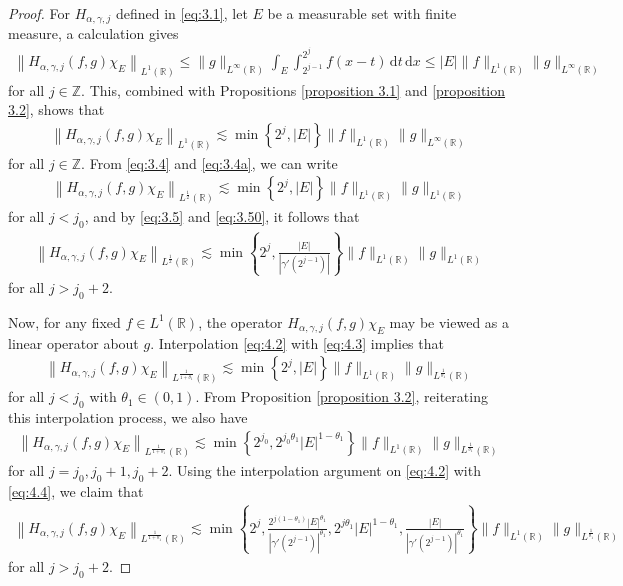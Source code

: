 \documentclass[10pt,a4paper]{amsart}
\begin{document}
\begin{proof}
For $H_{\alpha,\gamma,j}$ defined in \eqref{eq:3.1}, let $E$ be a measurable set with finite measure, a calculation gives
\begin{align*}
 \left \|H_{\alpha,\gamma,j}(f,g)\chi_{E}\right\|_{L^{1}(\mathbb{R})}
  \leq\|g\|_{L^{\infty}(\mathbb{R})}\int_{E}\int_{2^{j-1}}^{2^j}f(x-t)\,\textrm{d}t\,\textrm{d}x
  \leq|E|\|f\|_{L^{1}(\mathbb{R})}\|g\|_{L^{\infty}(\mathbb{R})}
 \end{align*}
for all $j\in \mathbb{Z}$. This, combined with Propositions \ref{proposition 3.1} and \ref{proposition 3.2}, shows that
  \begin{align}\label{eq:4.2}
  \left\|H_{\alpha,\gamma,j}(f,g)\chi_{E}\right\|_{L^{1}(\mathbb{R})}\lesssim \min\left\{2^j,|E|\right\}\|f\|_{L^{1}(\mathbb{R})}\|g\|_{L^{\infty}(\mathbb{R})}
  \end{align}
for all $j\in \mathbb{Z}$. From \eqref{eq:3.4} and \eqref{eq:3.4a}, we can write
  \begin{align}\label{eq:4.3}
  \left\|H_{\alpha,\gamma,j}(f,g)\chi_{E}\right\|_{L^{\frac{1}{2}}(\mathbb{R})}\lesssim \min\left\{2^j,|E|\right\}\|f\|_{L^{1}(\mathbb{R})}\|g\|_{L^{1}(\mathbb{R})}
  \end{align}
  for all $j<j_0$, and by \eqref{eq:3.5} and \eqref{eq:3.50}, it follows that
   \begin{align}\label{eq:4.4}
  \left\|H_{\alpha,\gamma,j}(f,g)\chi_{E}\right\|_{L^{\frac{1}{2}}(\mathbb{R})}\lesssim \min\left\{2^j,\frac{|E|}{|\gamma'(2^{j-1})|}\right\}\|f\|_{L^{1}(\mathbb{R})}\|g\|_{L^{1}(\mathbb{R})}
  \end{align}
 for all $j>j_0+2$.

Now, for any fixed $f\in L^1(\mathbb{R})$, the operator $H_{\alpha,\gamma,j}(f,g)\chi_{E}$ may be viewed as a linear operator about $g$. Interpolation \eqref{eq:4.2} with \eqref{eq:4.3} implies that
 \begin{align}\label{eq:4.5}
  \left\|H_{\alpha,\gamma,j}(f,g)\chi_{E}\right\|_{L^{\frac{1}{1+\theta_1}}(\mathbb{R})}\lesssim \min\left\{2^j,|E|\right\}\|f\|_{L^{1}(\mathbb{R})}\|g\|_{L^{\frac{1}{\theta_1}}(\mathbb{R})}
  \end{align}
for all $j<j_0$ with $\theta_1\in (0,1)$. From Proposition \ref{proposition 3.2}, reiterating this interpolation process, we also have
\begin{align}\label{eq:4.7}
  \left\|H_{\alpha,\gamma,j}(f,g)\chi_{E}\right\|_{L^{\frac{1}{1+\theta_1}}(\mathbb{R})}\lesssim \min\left\{2^{j_0},2^{{j_0}\theta_{1}}|E|^{1-\theta_{1}}\right\}\|f\|_{L^{1}(\mathbb{R})}\|g\|_{L^{\frac{1}{\theta_1}}(\mathbb{R})}
  \end{align}
for all $j=j_0, j_0+1, j_0+2$. Using the interpolation argument on \eqref{eq:4.2} with \eqref{eq:4.4}, we claim that
\begin{align}\label{eq:4.6}
  \left\|H_{\alpha,\gamma,j}(f,g)\chi_{E}\right\|_{L^{\frac{1}{1+\theta_1}}(\mathbb{R})}\lesssim \min\left\{2^j,\frac{2^{j(1-\theta_{1})}|E|^{\theta_1}}{|\gamma'(2^{j-1})|^{\theta_{1}}},2^{j\theta_1} |E|^{1-\theta_1},\frac{|E|}{|\gamma'(2^{j-1})|^{\theta_1}}\right\}\|f\|_{L^{1}(\mathbb{R})}\|g\|_{L^{\frac{1}{\theta_1}}(\mathbb{R})}
  \end{align}
for all $j>j_0+2$.


\end{proof}
\end{document}
